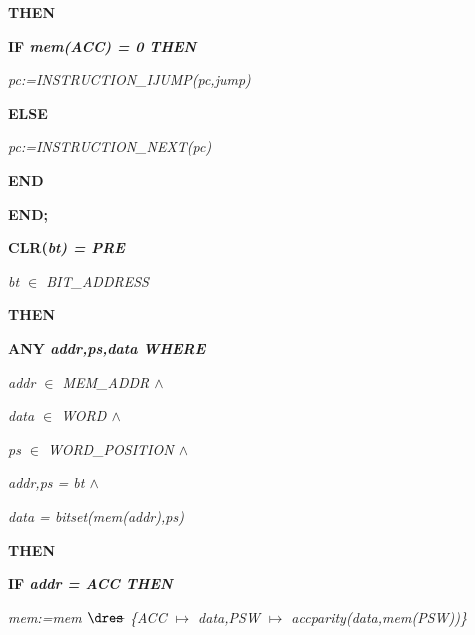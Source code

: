 \begin{sloppypar}
\hspace*{0.10in}\bf THEN

\hspace*{0.20in}\bf IF \it mem\rm (\it ACC\rm ) \rm = \rm 0 \bf THEN

\hspace*{0.30in}\it pc\rm :=\it INSTRUCTION\_IJUMP\rm (\it pc\rm ,\it jump\rm )

\hspace*{0.20in}\bf ELSE

\hspace*{0.30in}\it pc\rm :=\it INSTRUCTION\_NEXT\rm (\it pc\rm )

\hspace*{0.20in}\bf END

\hspace*{0.10in}\bf END\rm ;

\hspace*{0.10in}\bf CLR\rm (\it bt\rm ) \rm = \bf PRE

\hspace*{0.20in}\it bt $\in$  \it BIT\_ADDRESS

\hspace*{0.10in}\bf THEN

\hspace*{0.20in}\bf ANY \it addr\rm ,\it ps\rm ,\it data \bf WHERE

\hspace*{0.30in}\it addr $\in$  \it MEM\_ADDR  $\land$ 

\hspace*{0.30in}\it data $\in$  \it WORD  $\land$ 

\hspace*{0.30in}\it ps $\in$  \it WORD\_POSITION  $\land$ 

\hspace*{0.30in}\it addr\rm ,\it ps \rm = \it bt  $\land$ 

\hspace*{0.30in}\it data \rm = \it bitset\rm (\it mem\rm (\it addr\rm )\rm ,\it ps\rm )

\hspace*{0.20in}\bf THEN

\hspace*{0.30in}\bf IF \it addr \rm = \it ACC \bf THEN

\hspace*{0.40in}\it mem\rm :=\it mem $\lover$ \rm \{\it ACC $\mapsto$ \it data\rm ,\it PSW $\mapsto$ \it accparity\rm (\it data\rm ,\it mem\rm (\it PSW\rm )\rm )\rm \}


\end{sloppypar}
